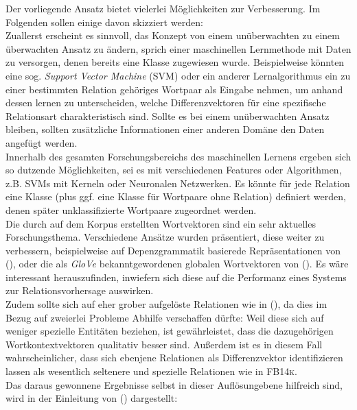 Der vorliegende Ansatz bietet vielerlei Möglichkeiten zur Verbesserung. Im Folgenden sollen einige davon skizziert werden:\\
Zuallerst erscheint es sinnvoll, das Konzept von einem unüberwachten zu einem überwachten Ansatz zu ändern, sprich einer
maschinellen Lernmethode mit Daten zu versorgen, denen bereits eine Klasse zugewiesen wurde. Beispielweise könnten eine
sog. \emph{Support Vector Machine} (SVM) oder ein anderer Lernalgorithmus ein zu einer bestimmten Relation gehöriges Wortpaar
als Eingabe nehmen, um anhand dessen lernen zu unterscheiden, welche Differenzvektoren für eine spezifische Relationsart
charakteristisch sind. Sollte es bei einem unüberwachten Ansatz bleiben, sollten zusätzliche Informationen einer anderen Domäne
den Daten angefügt werden.\\
Innerhalb des gesamten Forschungsbereichs des maschinellen Lernens ergeben sich so dutzende Möglichkeiten,
sei es mit verschiedenen Features oder Algorithmen, z.B. SVMs mit Kerneln oder Neuronalen Netzwerken. Es könnte für jede
Relation eine Klasse (plus ggf. eine Klasse für Wortpaare ohne Relation) definiert werden, denen später unklassifizierte
Wortpaare zugeordnet werden.\\

Die durch auf dem Korpus erstellten Wortvektoren sind ein sehr aktuelles Forschungsthema. Verschiedene Ansätze wurden
präsentiert, diese weiter zu verbessern, beispielweise auf Depenzgrammatik basierede Repräsentationen von (\cite{levy2014dependency}),
oder die als \emph{GloVe} bekanntgewordenen globalen Wortvektoren von (\cite{pennington2014glove}).
Es wäre interessant herauszufinden, inwiefern sich diese auf die Performanz eines Systems zur Relationsvorhersage
auswirken.\\

Zudem sollte sich auf eher grober aufgelöste Relationen wie in (\cite{hendrickx2009semeval}), da dies im Bezug
auf zweierlei Probleme Abhilfe verschaffen dürfte: Weil diese sich auf weniger spezielle Entitäten beziehen, ist gewährleistet,
dass die dazugehörigen Wortkontextvektoren qualitativ besser sind. Außerdem ist es in diesem Fall wahrscheinlicher, dass
sich ebenjene Relationen als Differenzvektor identifizieren lassen als wesentlich seltenere und spezielle Relationen wie
in \textsc{FB14k}.\\
Das daraus gewonnene Ergebnisse selbst in dieser Auflösungebene hilfreich sind, wird in der Einleitung von (\cite{hendrickx2009semeval})
dargestellt:

